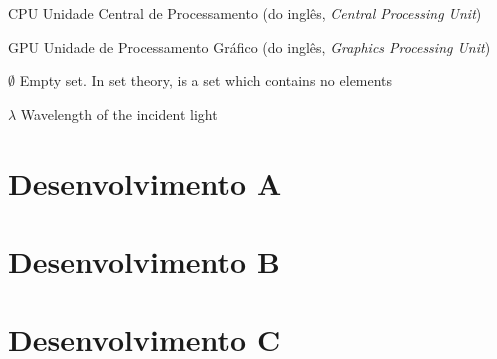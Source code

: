 \documentclass[
	12pt,		%
    openright, 	%
    oneside,	%
    a4paper,	%
	french,				%
	spanish,			%
	english,				%
    brazil,				%
]{abntex2}
\begin{document}

\begin{siglas}

    \item[CPU] Unidade Central de Processamento (do inglês, \textit{Central Processing Unit})
    \item[GPU] Unidade de Processamento Gráfico (do inglês, \textit{Graphics Processing Unit})

\end{siglas}

\begin{simbolos}

  \item[$\emptyset$] Empty set. In set theory, is a set which contains no elements
   
  \item[$\lambda$] Wavelength of the incident light

\cleardoublepage
   
\end{simbolos}

\tableofcontents*
\cleardoublepage


\textual




%
\chapter{Desenvolvimento A}
\Blindtext
%
\chapter{Desenvolvimento B}
\Blindtext
%
\chapter{Desenvolvimento C}
\Blindtext



\end{document}
